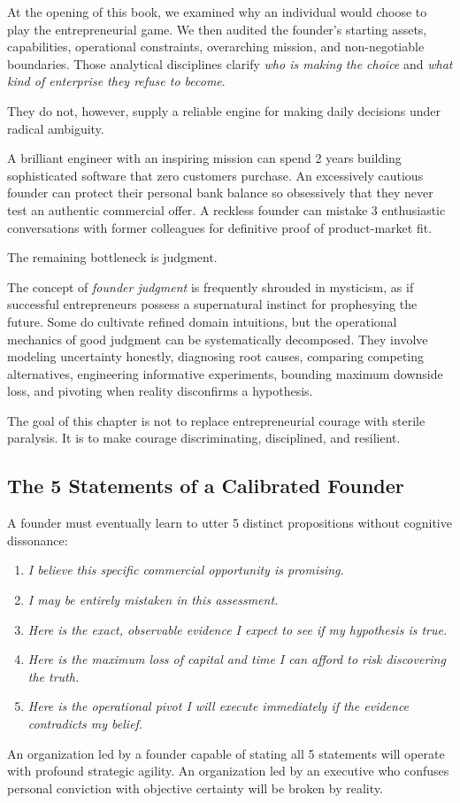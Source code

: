 At the opening of this book, we examined why an individual would choose to play the entrepreneurial game. We then audited the founder's starting assets, capabilities, operational constraints, overarching mission, and non-negotiable boundaries. Those analytical disciplines clarify \textit{who is making the choice} and \textit{what kind of enterprise they refuse to become}.

They do not, however, supply a reliable engine for making daily decisions under radical ambiguity.

A brilliant engineer with an inspiring mission can spend 2 years building sophisticated software that zero customers purchase. An excessively cautious founder can protect their personal bank balance so obsessively that they never test an authentic commercial offer. A reckless founder can mistake 3 enthusiastic conversations with former colleagues for definitive proof of product-market fit.

The remaining bottleneck is judgment.

The concept of \textit{founder judgment} is frequently shrouded in mysticism, as if successful entrepreneurs possess a supernatural instinct for prophesying the future. Some do cultivate refined domain intuitions, but the operational mechanics of good judgment can be systematically decomposed. They involve modeling uncertainty honestly, diagnosing root causes, comparing competing alternatives, engineering informative experiments, bounding maximum downside loss, and pivoting when reality disconfirms a hypothesis.

The goal of this chapter is not to replace entrepreneurial courage with sterile paralysis. It is to make courage discriminating, disciplined, and resilient.

\subsection{The 5 Statements of a Calibrated Founder}

A founder must eventually learn to utter 5 distinct propositions without cognitive dissonance:

\begin{enumerate}[leftmargin=12pt,itemsep=2pt,topsep=1pt,parsep=0pt]
  \item \textit{I believe this specific commercial opportunity is promising.}
  \item \textit{I may be entirely mistaken in this assessment.}
  \item \textit{Here is the exact, observable evidence I expect to see if my hypothesis is true.}
  \item \textit{Here is the maximum loss of capital and time I can afford to risk discovering the truth.}
  \item \textit{Here is the operational pivot I will execute immediately if the evidence contradicts my belief.}
\end{enumerate}

An organization led by a founder capable of stating all 5 statements will operate with profound strategic agility. An organization led by an executive who confuses personal conviction with objective certainty will be broken by reality.

